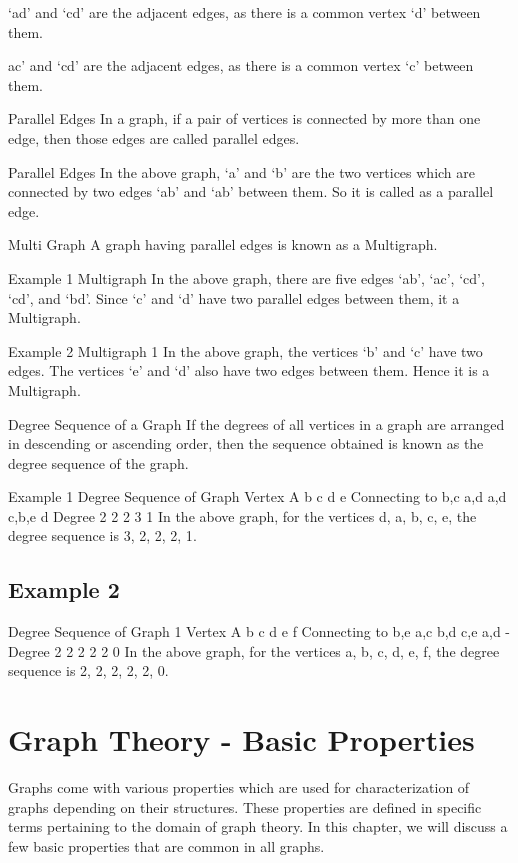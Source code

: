 ‘ad’ and ‘cd’ are the adjacent edges, as there is a common vertex ‘d’ between them.

ac’ and ‘cd’ are the adjacent edges, as there is a common vertex ‘c’ between them.

Parallel Edges
In a graph, if a pair of vertices is connected by more than one edge, then those edges are called parallel edges.

Parallel Edges
In the above graph, ‘a’ and ‘b’ are the two vertices which are connected by two edges ‘ab’ and ‘ab’ between them. So it is called as a parallel edge.

Multi Graph
A graph having parallel edges is known as a Multigraph.

Example 1
Multigraph
In the above graph, there are five edges ‘ab’, ‘ac’, ‘cd’, ‘cd’, and ‘bd’. Since ‘c’ and ‘d’ have two parallel edges between them, it a Multigraph.

Example 2
Multigraph 1
In the above graph, the vertices ‘b’ and ‘c’ have two edges. The vertices ‘e’ and ‘d’ also have two edges between them. Hence it is a Multigraph.

Degree Sequence of a Graph
If the degrees of all vertices in a graph are arranged in descending or ascending order, then the sequence obtained is known as the degree sequence of the graph.

Example 1
Degree Sequence of Graph
Vertex	A	b	c	d	e
Connecting to	b,c	a,d	a,d	c,b,e	d
Degree	2	2	2	3	1
In the above graph, for the vertices {d, a, b, c, e}, the degree sequence is {3, 2, 2, 2, 1}.

\subsection{Example 2}
Degree Sequence of Graph 1
Vertex	A	b	c	d	e	f
Connecting to	b,e	a,c	b,d	c,e	a,d	-
Degree	2	2	2	2	2	0
In the above graph, for the vertices {a, b, c, d, e, f}, the degree sequence is {2, 2, 2, 2, 2, 0}.

\newpage
\section{Graph Theory - Basic Properties}

 
Graphs come with various properties which are used for characterization of graphs depending on their structures. These properties are defined in specific terms pertaining to the domain of graph theory. In this chapter, we will discuss a few basic properties that are common in all graphs.

